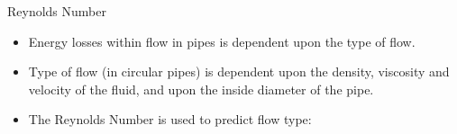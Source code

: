 \documentclass[9pt,xcolor={svgnames, x11names},professionalfonts, mathserif]{beamer}
\begin{document}
\begin{frame}{Reynolds Number}
 \begin{itemize}
  \item Energy losses within flow in pipes is dependent upon the type of flow.\parm
  \item Type of flow (in circular pipes) is dependent upon the density, viscosity and velocity of the fluid, and upon
        the inside diameter of the pipe.\parm
  \item The Reynolds Number is used to predict flow type:
 \end{itemize}


\end{frame}
\end{document}

